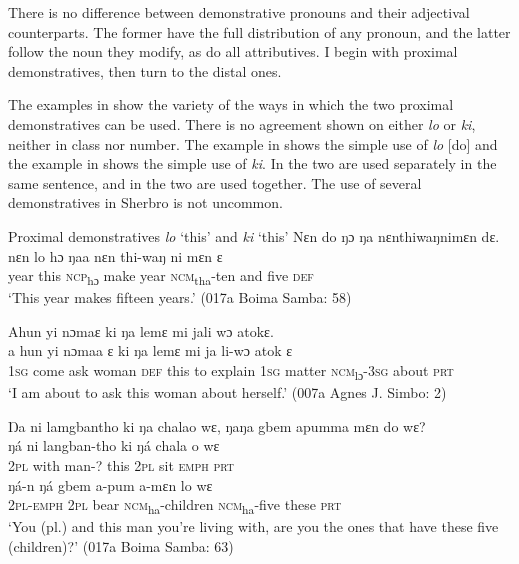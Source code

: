 There is no difference between demonstrative pronouns and their adjectival counterparts. The former have the full distribution of any pronoun, and the latter follow the noun they modify, as do all attributives. I begin with proximal demonstratives, then turn to the distal ones.

The examples in  show the variety of the ways in which the two proximal demonstratives can be used. There is no agreement shown on either \textit{lo} or \textit{ki}, neither in class nor number. The example in  shows the simple use of \textit{lo} [do] and the example in  shows the simple use of \textit{ki}. In  the two are used separately in the same sentence, and in  the two are used together. The use of several demonstratives in Sherbro is not uncommon.

\newpage

\ea%
    \label{ex:57}
    Proximal demonstratives \textit{lo} ‘this' and \textit{ki} ‘this'
    \ea\label{ex:57a} Nɛn do ŋɔ ŋa nɛnthiwaŋnimɛn dɛ.\\
    \gll nɛn  lo    hɔ      ŋaa    nɛn  thi-waŋ    ni    mɛn  ɛ\\
    year  this  \textsc{ncp}\textsubscript{hɔ}    make    year  \textsc{ncm}\textsubscript{tha}{}-ten  and  five  \textsc{def}\\
    \glt ‘This year makes fifteen years.' (017a Boima Samba: 58)

    \ex\label{ex:57b} Ahun yi nɔmaɛ ki ŋa lemɛ mi jali wɔ atokɛ.\\
    \gll a    hun    yi    nɔmaa  ɛ    ki    ŋa  lemɛ    mi    ja        li-wɔ      atok  ɛ\\
    \textsc{1sg}  come    ask  woman  \textsc{def}  this  to  explain  \textsc{1sg}  matter  \textsc{ncm}\textsubscript{lɔ}{}-\textsc{3sg}  about  \textsc{prt}\\
    \glt ‘I am about to ask this woman about herself.' (007a Agnes J. Simbo: 2)
    
    \ex\label{ex:57c} Ŋa  ni  lamgbantho ki ŋa   chalao wɛ, ŋaŋa gbem apumma mɛn do wɛ?\\
    \gll ŋá    ni    langban-tho    ki    ŋá      chala    o      wɛ\\
    \textsc{2pl}  with  man-?    this  \textsc{2pl}    sit      \textsc{emph}    \textsc{prt}\\
    \gll ŋá-n      ŋá    gbem    a-pum        a-mɛn    lo      wɛ\\
    \textsc{2pl}{}-\textsc{emph}  \textsc{2pl}  bear    \textsc{ncm}\textsubscript{ha}{}-children  \textsc{ncm}\textsubscript{ha}{}-five  these    \textsc{prt}\\
    \glt ‘You (pl.) and this man you're living with, are you the ones that have these five (children)?' (017a Boima Samba: 63)

